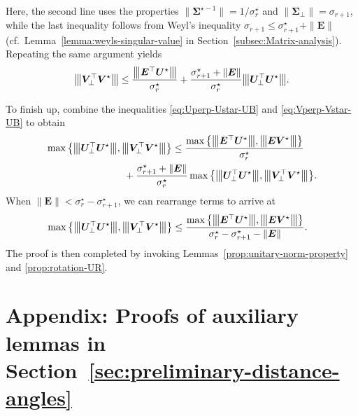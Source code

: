 %
Here, the second line uses the properties $\|\bm{\Sigma}^{\star-1}\|=1/\sigma_{r}^{\star}$ and $\|\bm{\Sigma}_{\perp}\|= \sigma_{r+1}$, while
the last inequality follows from Weyl's inequality $\sigma_{r+1}\leq \sigma_{r+1}^{\star}+\|\bm{E}\|$ (cf.~Lemma~\ref{lemma:weyls-singular-value} in Section~\ref{subsec:Matrix-analysis}). Repeating the same argument yields
%
\begin{align}
{\big\vert\kern-0.25ex\big\vert\kern-0.25ex\big\vert \bm{V}_{\perp}^{\top}\bm{V}^{\star} \big\vert\kern-0.25ex\big\vert\kern-0.25ex\big\vert}\leq\frac{{\big\vert\kern-0.25ex\big\vert\kern-0.25ex\big\vert \bm{E}^{\top}\bm{U}^{\star} \big\vert\kern-0.25ex\big\vert\kern-0.25ex\big\vert}}{\sigma_{r}^{\star}}
	+\frac{\sigma_{r+1}^{\star}+\|\bm{E}\|}{\sigma_{r}^{\star}}{\big\vert\kern-0.25ex\big\vert\kern-0.25ex\big\vert \bm{U}_{\perp}^{\top}\bm{U}^{\star} \big\vert\kern-0.25ex\big\vert\kern-0.25ex\big\vert}.
	\label{eq:Vperp-Vstar-UB}
\end{align}


To finish up, combine the inequalities \eqref{eq:Uperp-Ustar-UB} and \eqref{eq:Vperp-Vstar-UB} to obtain
%
\begin{align*}
 & \max\big\{ \vertiiibig{\bm{U}_{\perp}^{\top}\bm{U}^{\star}},\vertiiibig{\bm{V}_{\perp}^{\top}\bm{V}^{\star}}\big\}
  \leq \frac{  \max\big\{  \vertiiibig{\bm{E}^{\top}\bm{U}^{\star}},\vertiiibig{\bm{E}\bm{V}^{\star}}  \big\} }{\sigma_r^{\star}}  \\
	&	\qquad\qquad\qquad\qquad
	+ \frac{\sigma_{r+1}^{\star}+\|\bm{E}\|}{\sigma_{r}^{\star}} \max\big\{ \vertiiibig{\bm{U}_{\perp}^{\top}\bm{U}^{\star}},\vertiiibig{\bm{V}_{\perp}^{\top}\bm{V}^{\star}}\big\} .
\end{align*}
%
When $\|\bm{E}\|<\sigma_r^{\star} - \sigma_{r+1}^{\star}$, we can rearrange terms to arrive at
%
\begin{align*}
 & \max\big\{ {\big\vert\kern-0.25ex\big\vert\kern-0.25ex\big\vert \bm{U}_{\perp}^{\top}\bm{U}^{\star} \big\vert\kern-0.25ex\big\vert\kern-0.25ex\big\vert},{\big\vert\kern-0.25ex\big\vert\kern-0.25ex\big\vert \bm{V}_{\perp}^{\top}\bm{V}^{\star} \big\vert\kern-0.25ex\big\vert\kern-0.25ex\big\vert}\big\}
	\leq\frac{\max\big\{ {\big\vert\kern-0.25ex\big\vert\kern-0.25ex\big\vert \bm{E}^{\top}\bm{U}^{\star} \big\vert\kern-0.25ex\big\vert\kern-0.25ex\big\vert},{\big\vert\kern-0.25ex\big\vert\kern-0.25ex\big\vert \bm{E}\bm{V}^{\star} \big\vert\kern-0.25ex\big\vert\kern-0.25ex\big\vert}\big\} }{\sigma_{r}^{\star}-\sigma_{r+1}^{\star}-\|\bm{E}\|}.
\end{align*}
%
The proof is then completed by invoking Lemmas~\ref{prop:unitary-norm-property} and \ref{prop:rotation-UR}.




\section{Appendix: Proofs of auxiliary lemmas in Section~\ref{sec:preliminary-distance-angles}}
\label{sec:proof-preliminary-dist-angles}

